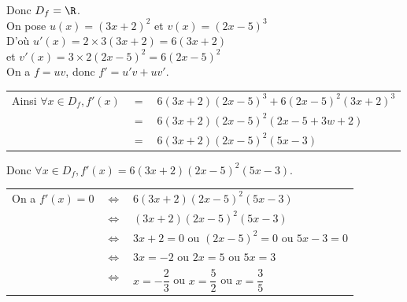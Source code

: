 \vspace*{.3cm}

Donc $D_f = \R$. \\

On pose $u(x) = \left(3x+2\right)^2$ et $v(x) = \left(2x - 5\right)^3$ \\
D'où $u'(x) = 2\times 3\left(3x+2\right) = 6\left(3x+2\right)$ \\ et $v'(x) = 3 \times 2\left(2x-5\right)^2 = 6\left(2x-5\right)^2$ \\

On a $f = uv$, donc $f' = u'v+uv'$. \vspace*{.3cm} \\

\begin{tabular}{lll}
\hspace*{-.3cm} Ainsi $\forall x \in D_f, f'(x)$ & $=$ &  $6\left(3x+2\right)\left(2x-5\right)^3 + 6\left(2x-5\right)^2\left(3x+2\right)^3$ \vspace*{.3cm} \\
& $=$ & $6\left(3x+2\right)\left(2x-5\right)^2\left(2x-5 + 3w + 2\right)$ \vspace*{.3cm} \\
& $=$ & $6\left(3x+2\right)\left(2x-5\right)^2\left(5x-3\right)$ \\
\end{tabular}

\vspace*{.3cm}

Donc $\forall x \in D_f, f'(x) = 6\left(3x+2\right)\left(2x-5\right)^2\left(5x-3\right)$. \vspace*{.3cm} \\

\begin{tabular}{lll}
\hspace*{-.3cm} On a $f'(x) = 0$ & $\Longleftrightarrow$ & $6\left(3x+2\right)\left(2x-5\right)^2\left(5x-3\right)$ \vspace*{.3cm} \\
& $\Longleftrightarrow$ & $\left(3x+2\right)\left(2x-5\right)^2\left(5x-3\right)$ \vspace*{.3cm} \\
& $\Longleftrightarrow$ & $3x+2 = 0$ ou $\left(2x-5\right)^2 = 0$ ou $5x-3 = 0$ \vspace*{.3cm} \\
& $\Longleftrightarrow$ & $3x = -2$ ou $2x = 5$ ou $5x = 3$ \vspace*{.3cm} \\
& $\Longleftrightarrow$ & $x = -\dfrac{2}{3}$ ou $x = \dfrac{5}{2}$ ou $x = \dfrac{3}{5}$ \\
\end{tabular}

